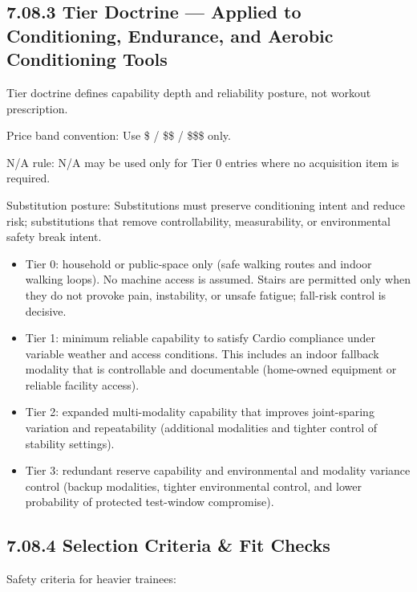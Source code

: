 \documentclass[10pt]{article}
\begin{document}
\subsection*{7.08.3 Tier Doctrine — Applied to Conditioning, Endurance, and Aerobic Conditioning Tools}
{}

Tier doctrine defines capability depth and reliability posture, not workout prescription.

Price band convention: Use \$ / \$\$ / \$\$\$ only.

N/A rule: N/A may be used only for Tier 0 entries where no acquisition item is required.

Substitution posture: Substitutions must preserve conditioning intent and reduce risk; substitutions that remove controllability, measurability, or environmental safety break intent.

\begin{itemize}
\item Tier 0: household or public-space only (safe walking routes and indoor walking loops). No machine access is assumed. Stairs are permitted only when they do not provoke pain, instability, or unsafe fatigue; fall-risk control is decisive.
\item Tier 1: minimum reliable capability to satisfy Cardio compliance under variable weather and access conditions. This includes an indoor fallback modality that is controllable and documentable (home-owned equipment or reliable facility access).
\item Tier 2: expanded multi-modality capability that improves joint-sparing variation and repeatability (additional modalities and tighter control of stability settings).
\item Tier 3: redundant reserve capability and environmental and modality variance control (backup modalities, tighter environmental control, and lower probability of protected test-window compromise).
\end{itemize}

\subsection*{7.08.4 Selection Criteria \& Fit Checks}
{}

Safety criteria for heavier trainees:
\end{document}
